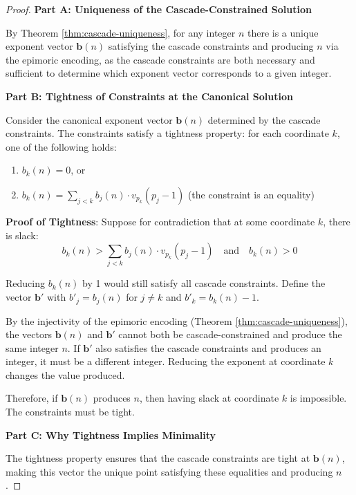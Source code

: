 \begin{proof}

\noindent \textbf{Part A: Uniqueness of the Cascade-Constrained Solution}

By Theorem \ref{thm:cascade-uniqueness}, for any integer $n$ there is a unique exponent vector $\mathbf{b}(n)$ satisfying the cascade constraints and producing $n$ via the epimoric encoding, as the cascade constraints are both necessary and sufficient to determine which exponent vector corresponds to a given integer.

\noindent \textbf{Part B: Tightness of Constraints at the Canonical Solution}

Consider the canonical exponent vector $\mathbf{b}(n)$ determined by the cascade constraints. The constraints satisfy a tightness property: for each coordinate $k$, one of the following holds:
\begin{enumerate}
\item $b_k(n) = 0$, or
\item $b_k(n) = \sum_{j < k} b_j(n) \cdot v_{p_k}(p_j - 1)$ (the constraint is an equality)
\end{enumerate}

\noindent \textbf{Proof of Tightness}: Suppose for contradiction that at some coordinate $k$, there is slack:
\begin{equation}
b_k(n) > \sum_{j < k} b_j(n) \cdot v_{p_k}(p_j - 1) \quad \text{and} \quad b_k(n) > 0
\end{equation}

Reducing $b_k(n)$ by 1 would still satisfy all cascade constraints. Define the vector $\mathbf{b}'$ with $b'_j = b_j(n)$ for $j \neq k$ and $b'_k = b_k(n) - 1$.

By the injectivity of the epimoric encoding (Theorem \ref{thm:cascade-uniqueness}), the vectors $\mathbf{b}(n)$ and $\mathbf{b}'$ cannot both be cascade-constrained and produce the same integer $n$. If $\mathbf{b}'$ also satisfies the cascade constraints and produces an integer, it must be a different integer. Reducing the exponent at coordinate $k$ changes the value produced.

Therefore, if $\mathbf{b}(n)$ produces $n$, then having slack at coordinate $k$ is impossible. The constraints must be tight.

\noindent \textbf{Part C: Why Tightness Implies Minimality}

The tightness property ensures that the cascade constraints are tight at $\mathbf{b}(n)$, making this vector the unique point satisfying these equalities and producing $n$.


\end{proof}
